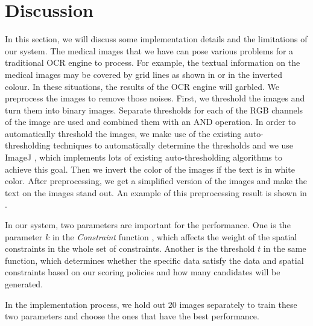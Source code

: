 \section{Discussion}
\label{sec:discuss}
In this section, we will discuss some implementation details
and the limitations of our system.
The medical images that we have can pose various problems
for a traditional OCR engine to process. For example,
the textual information on the medical images may be
covered by grid lines as shown in  or
in the inverted colour. In these situations, the results of
the OCR engine will garbled. We preprocess the
images to remove those noises. First, we threshold the
images and turn them into binary images.
Separate thresholds for each of the RGB channels of the image
are used and combined them with an AND operation.
In order to automatically threshold the images,
we make use of the existing auto-thresholding techniques
to automatically determine the thresholds and we
use ImageJ \cite{schneider2012671}, which implements lots
of existing auto-thresholding algorithms to achieve this goal.
Then we invert the color of the images if the text
is in white color.
After preprocessing, we get a simplified version of the
images and make the text on the images stand out.
An example of this preprocessing result is shown in .


In our system, two parameters are important for the
performance.
One is the parameter $k$ in the {\em Constraint} function
,
which affects the weight of
the spatial constraints in the whole set of constraints.
Another
is the threshold $t$ in the same function, which
determines whether the specific data satisfy the
data and spatial constraints based on our scoring policies
and how many candidates will be generated.

In the implementation process,
we hold out 20 images separately to train these two parameters
and choose the ones that have the best performance.

